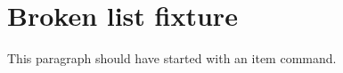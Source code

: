 \documentclass{article}
\begin{document}
\section{Broken list fixture}
\begin{itemize}
This paragraph should have started with an item command.
\end{itemize}
\end{document}
